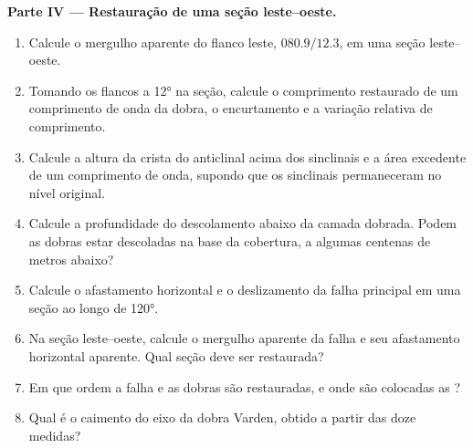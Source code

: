 \begin{problem}
\medskip\noindent\textbf{Parte IV --- Restauração de uma seção leste--oeste.}
\begin{enumerate}[resume]
  \item Calcule o mergulho aparente do flanco leste, $080.9/12.3$, em uma
        seção leste--oeste.
  \item Tomando os flancos a \ang{12} na seção, calcule o comprimento restaurado
        de um comprimento de onda da dobra, o encurtamento e a variação relativa
        de comprimento.
  \item Calcule a altura da crista do anticlinal acima dos sinclinais e a
        área excedente de um comprimento de onda, supondo que os sinclinais permaneceram
        no nível original.
  \item Calcule a profundidade do descolamento abaixo da camada dobrada. Podem as
        dobras estar descoladas na base da cobertura, a algumas centenas de metros
        abaixo?
  \item Calcule o afastamento horizontal e o deslizamento da falha principal em uma seção ao longo de
        \ang{120}.
  \item Na seção leste--oeste, calcule o mergulho aparente da falha e
        seu afastamento horizontal aparente. Qual seção deve ser restaurada?
  \item Em que ordem a falha e as dobras são restauradas, e onde são colocadas as
        ?
  \item Qual é o caimento do eixo da dobra Varden, obtido a partir das doze
        medidas?
\end{enumerate}
\end{problem}
